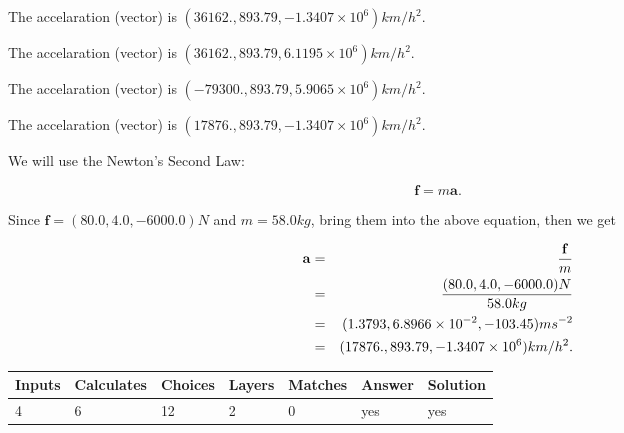 \documentclass[12pt]{article}
\begin{document}
 
The accelaration (vector) is
$(
36162.,
893.79 ,
-1.3407 \times 10^{6}
)km/h^2.
$
 
 
The accelaration (vector) is
$(
36162.,
893.79 ,
6.1195 \times 10^{6}
)km/h^2.
$
 
 
The accelaration (vector) is
$(
-79300.,
893.79 ,
5.9065 \times 10^{6}
)km/h^2.
$
 
 
\noindent{}
 
 
The accelaration (vector) is
$(
17876.,
893.79 ,
-1.3407 \times 10^{6}
)km/h^2.
$
 
 
\noindent{}
 
 
 
 
 
 
\noindent{}
 
 

We will use the Newton's Second Law:
 
\[
\mathbf{f}=m\mathbf{a}.
\]
 
Since $\mathbf{f}=( %
80.0,  %
4.0,  %
-6000.0 )N$
and $m= %
58.0 kg$, bring them into the above equation, then we get
 
\begin{eqnarray*}
\mathbf{a}&=&\frac{\mathbf{f}}m  \\
&=&\frac{(
80.0 ,
4.0 ,
-6000.0 )N
}{ %
58.0 kg}  \\
&=&(
1.3793 ,
6.8966 \times 10^{-2},
-103.45
)ms^{-2} \\
&=&(
17876. ,
893.79 ,
-1.3407 \times 10^{6}
)km/h^2.
\end{eqnarray*}
 
 
 
\noindent{}
 
 

 
 
\vspace{0.3in}
   
   
   
   
\noindent\begin{tabular}{|l|l|l|l|l|l|l|}
 \hline
Inputs & Calculates & Choices & Layers & Matches & Answer & Solution \\ \hline
           4 & 
           6 & 
          12
  & 
           2 & 
           0 & 
  yes & 
  yes 
  \\ \hline
 \end{tabular}
   
\end{document}
